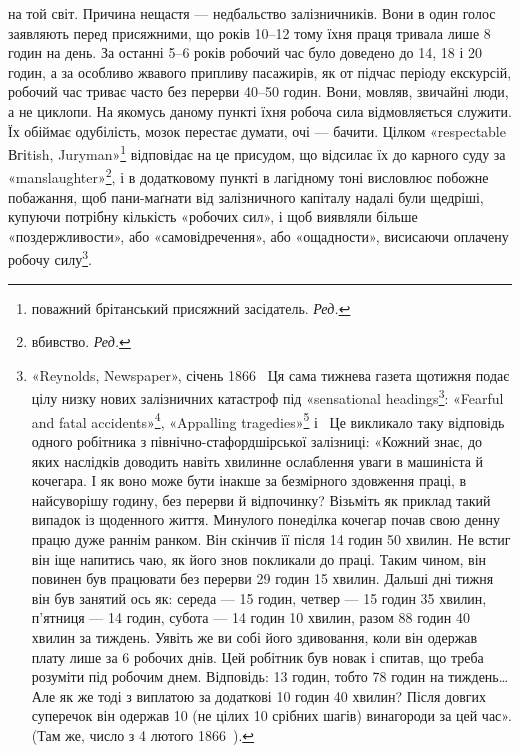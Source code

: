 \parcont{}  %
на той світ. Причина нещастя — недбальство залізничників. Вони
в один голос заявляють перед присяжними, що років 10--12 тому
їхня праця тривала лише 8 годин на день. За останні 5--6 років
робочий час було доведено до 14, 18 і 20 годин, а за особливо
жвавого припливу пасажирів, як от підчас періоду екскурсій,
робочий час триває часто без перерви 40--50 годин. Вони, мовляв,
звичайні люди, а не циклопи. На якомусь даному пункті
їхня робоча сила відмовляється служити. Їх обіймає одубілість,
мозок перестає думати, очі — бачити. Цілком «respectable Вгіtish,
Juryman»\footnote*{
поважний брітанський присяжний засідатель. \emph{Ред.}
} відповідає на це присудом, що відсилає їх до
карного суду за «manslaughter»\footnote*{
вбивство. \emph{Ред.}
}, і в додатковому пункті в лагідному
тоні висловлює побожне побажання, щоб пани-маґнати
від залізничного капіталу надалі були щедріші, купуючи потрібну
кількість «робочих сил», і щоб виявляли більше «поздержливости»,
або «самовідречення», або «ощадности», висисаючи
оплачену робочу силу\footnote{
«Reynolds, Newspaper», січень 1866~ Ця сама тижнева газета щотижня
подає цілу низку нових залізничних катастроф під «sensational headings\footnote*{
сенсаційними заголовками. \emph{Ред.}
}:
«Fearful and fatal accidents»\footnote*{
Жахливий і фатальний випадок. \emph{Ред.}
}, «Appalling tragedies»\footnote*{
Жахлива трагедія. \emph{Ред.}
} і~
Це викликало таку відповідь одного робітника з північно-стафордшірської
залізниці: «Кожний знає, до яких наслідків доводить навіть хвилинне
ослаблення уваги в машиніста й кочегара. І як воно може бути інакше
за безмірного здовження праці, в найсуворішу годину, без перерви й відпочинку?
Візьміть як приклад такий випадок із щоденного життя. Минулого
понеділка кочегар почав свою денну працю дуже раннім ранком.
Він скінчив її після 14 годин 50 хвилин. Не встиг він іще напитись чаю,
як його знов покликали до праці. Таким чином, він повинен був працювати
без перерви 29 годин 15 хвилин. Дальші дні тижня він був занятий ось
як: середа — 15 годин, четвер — 15 годин 35 хвилин, п’ятниця — 14 годин,
субота — 14 годин 10 хвилин, разом 88 годин 40 хвилин за тиждень.
Уявіть же ви собі його здивовання, коли він одержав плату лише за 6 робочих
днів. Цей робітник був новак і спитав, що треба розуміти під робочим
днем. Відповідь: 13 годин, тобто 78 годин на тиждень\dots{} Але як же тоді
з виплатою за додаткові 10 годин 40 хвилин? Після довгих суперечок він
одержав 10 (не цілих 10 срібних шагів) винагороди за цей час».
(Там же, число з 4 лютого 1866~).
}.

